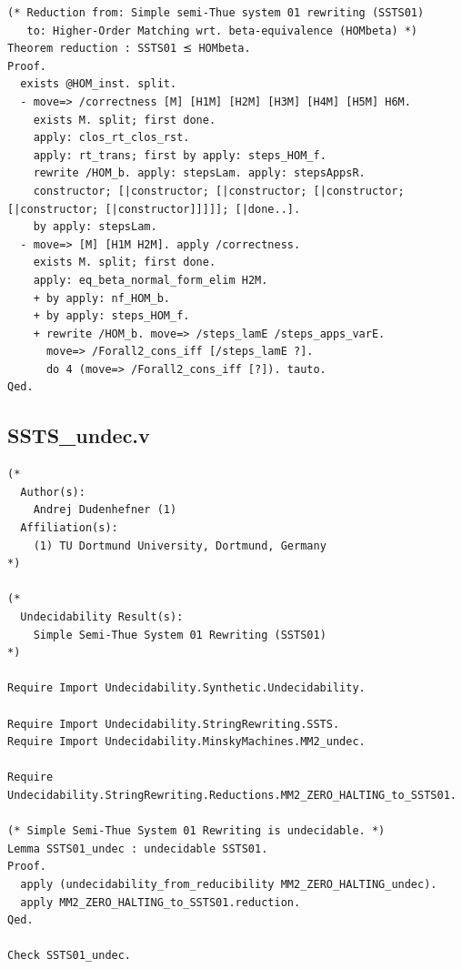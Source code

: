 \documentclass[10pt,a4paper]{amsart}
\begin{document}
\begin{lstlisting}
(* Reduction from: Simple semi-Thue system 01 rewriting (SSTS01)
   to: Higher-Order Matching wrt. beta-equivalence (HOMbeta) *)
Theorem reduction : SSTS01 ⪯ HOMbeta.
Proof.
  exists @HOM_inst. split.
  - move=> /correctness [M] [H1M] [H2M] [H3M] [H4M] [H5M] H6M.
    exists M. split; first done.
    apply: clos_rt_clos_rst.
    apply: rt_trans; first by apply: steps_HOM_f.
    rewrite /HOM_b. apply: stepsLam. apply: stepsAppsR.
    constructor; [|constructor; [|constructor; [|constructor; [|constructor; [|constructor]]]]]; [|done..].
    by apply: stepsLam.
  - move=> [M] [H1M H2M]. apply /correctness.
    exists M. split; first done.
    apply: eq_beta_normal_form_elim H2M.
    + by apply: nf_HOM_b.
    + by apply: steps_HOM_f.
    + rewrite /HOM_b. move=> /steps_lamE /steps_apps_varE.
      move=> /Forall2_cons_iff [/steps_lamE ?].
      do 4 (move=> /Forall2_cons_iff [?]). tauto.
Qed.

\end{lstlisting}

\subsection*{SSTS\_undec.v}
\begin{lstlisting}
(*
  Author(s):
    Andrej Dudenhefner (1)
  Affiliation(s):
    (1) TU Dortmund University, Dortmund, Germany
*)

(*
  Undecidability Result(s):
    Simple Semi-Thue System 01 Rewriting (SSTS01)
*)

Require Import Undecidability.Synthetic.Undecidability.

Require Import Undecidability.StringRewriting.SSTS.
Require Import Undecidability.MinskyMachines.MM2_undec.

Require Undecidability.StringRewriting.Reductions.MM2_ZERO_HALTING_to_SSTS01.

(* Simple Semi-Thue System 01 Rewriting is undecidable. *)
Lemma SSTS01_undec : undecidable SSTS01.
Proof.
  apply (undecidability_from_reducibility MM2_ZERO_HALTING_undec).
  apply MM2_ZERO_HALTING_to_SSTS01.reduction.
Qed.

Check SSTS01_undec.

\end{lstlisting}
\end{document}

